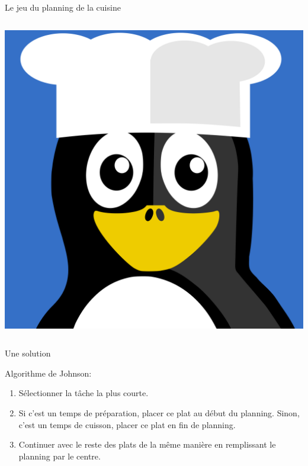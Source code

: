 \documentclass[landscape]{beamer}
\begin{document}
\begin{frame}{Le jeu du planning de la cuisine}
\begin{columns}
\begin{column}{0.25\textwidth}
\includegraphics[width=\textwidth]{cook.pdf}
\end{column}

\end{columns}

\end{frame}


\begin{frame}{Une solution}



\begin{block}{Algorithme de Johnson:}

\begin{enumerate}
\item Sélectionner la tâche la plus courte.
\item Si c'est un temps de préparation, placer ce plat au début du planning. Sinon, c'est un temps de cuisson, placer ce plat en fin de planning.
\item Continuer avec le reste des plats de la même manière en remplissant le planning par le centre.
\end{enumerate}

\end{block}


\end{frame}
\end{document}
